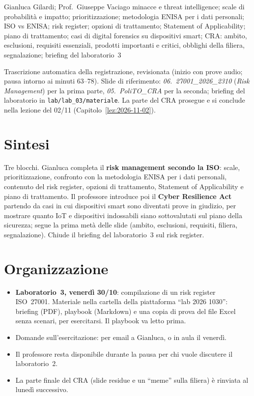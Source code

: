   {Gianluca Gilardi; Prof.~Giuseppe Vaciago}
  {minacce e threat intelligence; scale di probabilità e impatto; prioritizzazione; metodologia ENISA
   per i dati personali; ISO vs ENISA; risk register; opzioni di trattamento; Statement of
   Applicability; piano di trattamento; casi di digital forensics su dispositivi smart; CRA: ambito,
   esclusioni, requisiti essenziali, prodotti importanti e critici, obblighi della filiera, segnalazione;
   briefing del laboratorio~3}
\label{lez:2026-10-26}

\begin{nota}[Fonte]
Trascrizione automatica della registrazione, revisionata (inizio con prove audio; pausa intorno ai
minuti 63--78). Slide di riferimento: \emph{06.~27001\_2026\_2310} (\emph{Risk Management}) per la prima
parte, \emph{05.~PoliTO\_CRA} per la seconda; briefing del laboratorio in
\texttt{lab/lab\_03/materiale}. La parte del CRA prosegue e si conclude nella lezione del 02/11
(Capitolo~\ref{lez:2026-11-02}).
\end{nota}

\section{Sintesi}
Tre blocchi. Gianluca completa il \textbf{risk management secondo la ISO}: scale, prioritizzazione,
confronto con la metodologia ENISA per i dati personali, contenuto del risk register, opzioni di
trattamento, Statement of Applicability e piano di trattamento. Il professore introduce poi il
\textbf{Cyber Resilience Act} partendo da casi in cui dispositivi smart sono diventati prove in giudizio,
per mostrare quanto IoT e dispositivi indossabili siano sottovalutati sul piano della sicurezza; segue la
prima metà delle slide (ambito, esclusioni, requisiti, filiera, segnalazione). Chiude il briefing del
laboratorio~3 sul risk register.

\section{Organizzazione}
\begin{itemize}
  \item \textbf{Laboratorio~3, venerdì 30/10}: compilazione di un risk register ISO~27001. Materiale nella
    cartella della piattaforma ``lab 2026 1030'': briefing (PDF), playbook (Markdown) e una copia di prova
    del file Excel senza scenari, per esercitarsi. Il playbook va letto prima.
  \item Domande sull'esercitazione: per email a Gianluca, o in aula il venerdì.
  \item Il professore resta disponibile durante la pausa per chi vuole discutere il laboratorio~2.
  \item La parte finale del CRA (slide residue e un ``meme'' sulla filiera) è rinviata al lunedì
    successivo.
\end{itemize}

